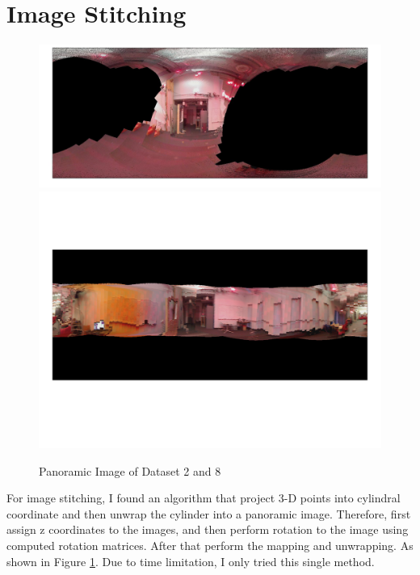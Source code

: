 \documentclass[english]{article}
\begin{document}
\section {Image Stitching}
\begin{figure}
\centering
\includegraphics[scale=0.2]{images/pano2.jpg} 
\includegraphics[scale=0.5]{images/pano8.png} 
\caption{Panoramic Image of Dataset 2 and 8}
\label{fig:pano}
\end{figure}

For image stitching, I found an algorithm that project 3-D points into cylindral coordinate and then unwrap the cylinder into a panoramic image. Therefore, first assign  z coordinates to the images, and then perform rotation to the image using computed rotation matrices. After that perform the mapping and unwrapping. As shown in Figure \ref{fig:pano}. Due to time limitation, I only tried this single method.
\end{document}
